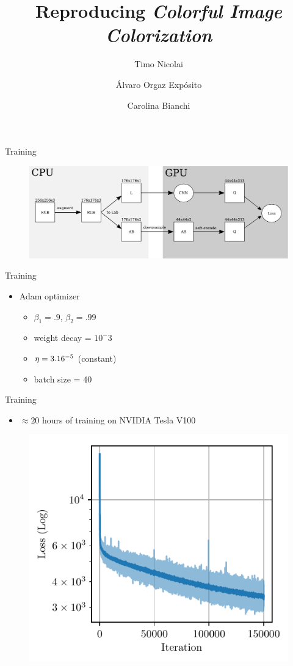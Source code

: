 \documentclass{beamer}
\title{Reproducing \textit{Colorful Image Colorization}}
\author{Timo Nicolai \and Álvaro Orgaz Expósito \and Carolina Bianchi}
\begin{document}
\begin{frame}
  \titlepage
\end{frame}

\begin{frame}{Training}
  \begin{figure}
    \includegraphics[width=\textwidth]{resources/training.pdf}
  \end{figure}
\end{frame}

\begin{frame}{Training}
  \begin{itemize}
    \item Adam optimizer
       \begin{itemize}
         \item $\beta_1 = .9$, $\beta_2 = .99$
         \item weight decay = $10^-3$
         \item $\eta = 3.16 \time 10^{-5}$ (constant)
         \item batch size = 40
       \end{itemize}
  \end{itemize}
\end{frame}

\begin{frame}{Training}
  \begin{itemize}
    \item $\approx 20$ hours of training on NVIDIA Tesla V100
  \end{itemize}

  \begin{figure}
    \includegraphics{resources/learning_curve.pdf}
  \end{figure}
\end{frame}
\end{document}
